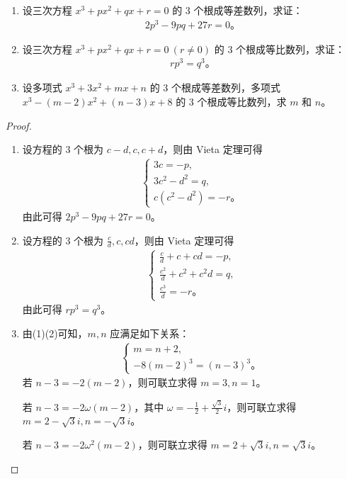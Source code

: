 \documentclass[../../main.tex]{subfiles}%
\begin{document}
\begin{example}
\begin{enumerate}[(1)]
\item 设三次方程 $x^3 + px^2 + qx + r = 0$ 的 3 个根成等差数列，求证：
\begin{align*}
2p^3 - 9pq + 27r = 0。
\end{align*}

\item 设三次方程 $x^3 + px^2 + qx + r = 0 \ (r \neq 0)$ 的 3 个根成等比数列，求证：
\begin{align*}
rp^3 = q^3。
\end{align*}

\item 设多项式 $x^3 + 3x^2 + mx + n$ 的 3 个根成等差数列，多项式 $x^3 - (m - 2)x^2 + (n - 3)x + 8$ 的 3 个根成等比数列，求 $m$ 和 $n$。
\end{enumerate}
\end{example}
\begin{proof}
\begin{enumerate}[(1)]
\item 设方程的 3 个根为 $c - d, c, c + d$，则由 Vieta 定理可得
\begin{align*}
\begin{cases}
3c = -p, \\
3c^2 - d^2 = q, \\
c(c^2 - d^2) = -r。
\end{cases}
\end{align*}
由此可得 $2p^3 - 9pq + 27r = 0。$

\item 设方程的 3 个根为 $\frac{c}{d}, c, cd$，则由 Vieta 定理可得
\begin{align*}
\begin{cases}
\frac{c}{d} + c + cd = -p, \\
\frac{c^2}{d} + c^2 + c^2 d = q, \\
\frac{c^3}{d} = -r。
\end{cases}
\end{align*}
由此可得 $rp^3 = q^3。$

\item 由(1)(2)可知，$m, n$ 应满足如下关系：
\begin{align*}
\begin{cases}
m = n + 2, \\
-8(m - 2)^3 = (n - 3)^3。
\end{cases}
\end{align*}
若 $n - 3 = -2(m - 2)$，则可联立求得 $m = 3, n = 1$。

若 $n - 3 = -2\omega(m - 2)$，其中 $\omega = -\frac{1}{2} + \frac{\sqrt{3}}{2}i$，则可联立求得 $m = 2 - \sqrt{3}i, n = -\sqrt{3}i$。

若 $n - 3 = -2\omega^2(m - 2)$，则可联立求得 $m = 2 + \sqrt{3}i, n = \sqrt{3}i。$
\end{enumerate}

\end{proof}
\end{document}

